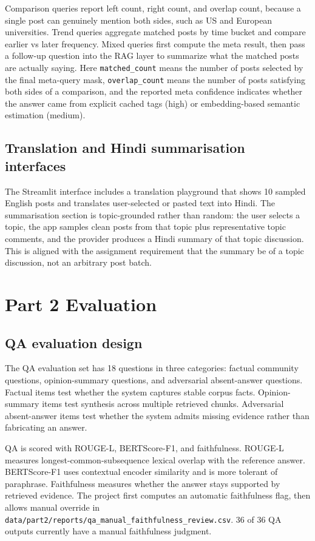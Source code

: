 \documentclass[11pt]{article}
\begin{document}
        Comparison queries report left count, right count, and overlap count, because a single post can genuinely mention both sides, such as US and European universities. Trend queries aggregate matched posts by time bucket and compare earlier vs later frequency. Mixed queries first compute the meta result, then pass a follow-up question into the RAG layer to summarize what the matched posts are actually saying. Here \texttt{matched\_count} means the number of posts selected by the final meta-query mask, \texttt{overlap\_count} means the number of posts satisfying both sides of a comparison, and the reported meta confidence indicates whether the answer came from explicit cached tags (high) or embedding-based semantic estimation (medium).

        \subsection*{Translation and Hindi summarisation interfaces}
        The Streamlit interface includes a translation playground that shows 10 sampled English posts and translates user-selected or pasted text into Hindi. The summarisation section is topic-grounded rather than random: the user selects a topic, the app samples clean posts from that topic plus representative topic comments, and the provider produces a Hindi summary of that topic discussion. This is aligned with the assignment requirement that the summary be of a topic discussion, not an arbitrary post batch.

        \section*{Part 2 Evaluation}
        \subsection*{QA evaluation design}
        The QA evaluation set has 18 questions in three categories: factual community questions, opinion-summary questions, and adversarial absent-answer questions. Factual items test whether the system captures stable corpus facts. Opinion-summary items test synthesis across multiple retrieved chunks. Adversarial absent-answer items test whether the system admits missing evidence rather than fabricating an answer.

        QA is scored with ROUGE-L, BERTScore-F1, and faithfulness. ROUGE-L measures longest-common-subsequence lexical overlap with the reference answer. BERTScore-F1 uses contextual encoder similarity and is more tolerant of paraphrase. Faithfulness measures whether the answer stays supported by retrieved evidence. The project first computes an automatic faithfulness flag, then allows manual override in \texttt{data/part2/reports/qa\_manual\_faithfulness\_review.csv}. 36 of 36 QA outputs currently have a manual faithfulness judgment.
\end{document}
